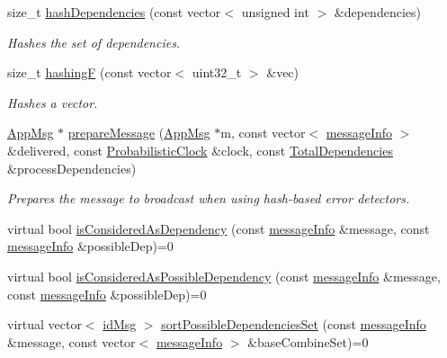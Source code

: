 \begin{DoxyCompactItemize}
size\+\_\+t \hyperlink{class_hash_error_detector_a37d0ee7d8a01b530a03262e4483c53d9}{hash\+Dependencies} (const vector$<$ unsigned int $>$ \&dependencies)
\begin{DoxyCompactList}\small\item\em Hashes the set of dependencies. \end{DoxyCompactList}\item 
size\+\_\+t \hyperlink{class_hash_error_detector_aa0b6a85ef4078e4851cd56b612a539c5}{hashingF} (const vector$<$ uint32\+\_\+t $>$ \&vec)
\begin{DoxyCompactList}\small\item\em Hashes a vector. \end{DoxyCompactList}\item 
\hyperlink{class_app_msg}{App\+Msg} $\ast$ \hyperlink{class_hash_error_detector_a2b1dad6a83a08fd7ce88e32f84638459}{prepare\+Message} (\hyperlink{class_app_msg}{App\+Msg} $\ast$m, const vector$<$ \hyperlink{structures_8h_a7e7bdc1d2fff8a9436f2f352b2711ed6}{message\+Info} $>$ \&delivered, const \hyperlink{class_probabilistic_clock}{Probabilistic\+Clock} \&clock, const \hyperlink{class_total_dependencies}{Total\+Dependencies} \&process\+Dependencies)
\begin{DoxyCompactList}\small\item\em Prepares the message to broadcast when using hash-\/based error detectors. \end{DoxyCompactList}\item 
virtual bool \hyperlink{class_hash_error_detector_a4693d4d5e327b19f75088cef52bcad7d}{is\+Considered\+As\+Dependency} (const \hyperlink{structures_8h_a7e7bdc1d2fff8a9436f2f352b2711ed6}{message\+Info} \&message, const \hyperlink{structures_8h_a7e7bdc1d2fff8a9436f2f352b2711ed6}{message\+Info} \&possible\+Dep)=0
\item 
virtual bool \hyperlink{class_hash_error_detector_ac0a25b9c1e27f98223869d11ca46d18f}{is\+Considered\+As\+Possible\+Dependency} (const \hyperlink{structures_8h_a7e7bdc1d2fff8a9436f2f352b2711ed6}{message\+Info} \&message, const \hyperlink{structures_8h_a7e7bdc1d2fff8a9436f2f352b2711ed6}{message\+Info} \&possible\+Dep)=0
\item 
virtual vector$<$ \hyperlink{structures_8h_a83a1d9a070efa5341da84cfd8e28d3e5}{id\+Msg} $>$ \hyperlink{class_hash_error_detector_aa7952b99e47ca7cef6dae2a271885599}{sort\+Possible\+Dependencies\+Set} (const \hyperlink{structures_8h_a7e7bdc1d2fff8a9436f2f352b2711ed6}{message\+Info} \&message, const vector$<$ \hyperlink{structures_8h_a7e7bdc1d2fff8a9436f2f352b2711ed6}{message\+Info} $>$ \&base\+Combine\+Set)=0

\end{DoxyCompactItemize}
